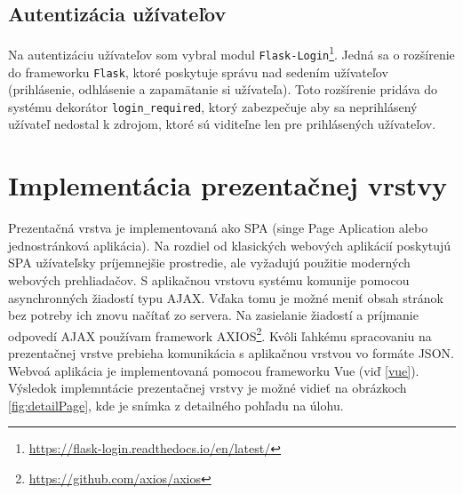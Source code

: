 \documentclass[slovak]{fitthesis}
\begin{document}
\subsection{Autentizácia užívateľov}
Na autentizáciu užívateľov som vybral modul \texttt{Flask-Login}\footnote{\url{https://flask-login.readthedocs.io/en/latest/}}. Jedná sa o rozšírenie do frameworku \texttt{Flask}, ktoré poskytuje správu nad sedením užívateľov (prihlásenie, odhlásenie a zapamätanie si užívateľa). Toto rozšírenie pridáva do systému dekorátor \texttt{login\_required}, ktorý zabezpečuje aby sa neprihlásený užívateľ nedostal k zdrojom, ktoré sú viditeľne len pre prihlásených užívateľov.


\section{Implementácia prezentačnej vrstvy}
Prezentačná vrstva je implementovaná ako SPA (singe Page Aplication alebo jednostránková aplikácia). Na rozdiel od klasických webových aplikácií poskytujú SPA užívateľsky príjemnejšie prostredie, ale vyžadujú použitie moderných webových prehliadačov. S aplikačnou vrstovu systému komunije pomocou asynchronných žiadostí typu AJAX. Vďaka tomu je možné meniť obsah stránok bez potreby ich znovu načítať zo servera. Na zasielanie žiadostí a príjmanie odpovedí AJAX používam framework AXIOS\footnote{\url{https://github.com/axios/axios}}. Kvôli ľahkému spracovaniu na prezentačnej vrstve prebieha komunikácia s aplikačnou vrstvou vo formáte JSON. Webvoá aplikácia je implementovaná pomocou frameworku Vue (viď \ref{vue}). Výsledok implemntácie prezentačnej vrstvy je možné vidieť na obrázkoch \ref{fig:detailPage}, kde je snímka z detailného pohľadu na úlohu.
\end{document}
